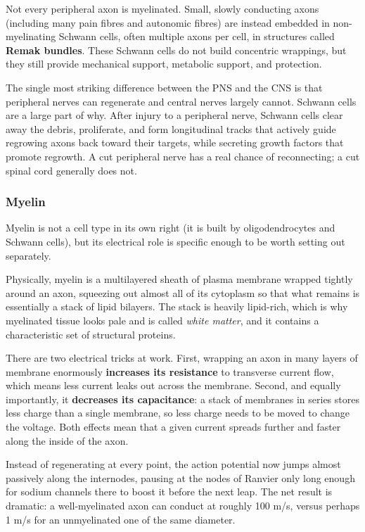 \documentclass[11pt]{article}
\begin{document}
Not every peripheral axon is myelinated. Small, slowly conducting axons (including many pain fibres and autonomic fibres) are instead embedded in non-myelinating Schwann cells, often multiple axons per cell, in structures called \textbf{Remak bundles}. These Schwann cells do not build concentric wrappings, but they still provide mechanical support, metabolic support, and protection.

The single most striking difference between the PNS and the CNS is that peripheral nerves can regenerate and central nerves largely cannot. Schwann cells are a large part of why. After injury to a peripheral nerve, Schwann cells clear away the debris, proliferate, and form longitudinal tracks that actively guide regrowing axons back toward their targets, while secreting growth factors that promote regrowth. A cut peripheral nerve has a real chance of reconnecting; a cut spinal cord generally does not.

\subsubsection{Myelin}

Myelin is not a cell type in its own right (it is built by oligodendrocytes and Schwann cells), but its electrical role is specific enough to be worth setting out separately.

Physically, myelin is a multilayered sheath of plasma membrane wrapped tightly around an axon, squeezing out almost all of its cytoplasm so that what remains is essentially a stack of lipid bilayers. The stack is heavily lipid-rich, which is why myelinated tissue looks pale and is called \textit{white matter}, and it contains a characteristic set of structural proteins.

There are two electrical tricks at work. First, wrapping an axon in many layers of membrane enormously \textbf{increases its resistance} to transverse current flow, which means less current leaks out across the membrane. Second, and equally importantly, it \textbf{decreases its capacitance}: a stack of membranes in series stores less charge than a single membrane, so less charge needs to be moved to change the voltage. Both effects mean that a given current spreads further and faster along the inside of the axon.

Instead of regenerating at every point, the action potential now jumps almost passively along the internodes, pausing at the nodes of Ranvier only long enough for sodium channels there to boost it before the next leap. The net result is dramatic: a well-myelinated axon can conduct at roughly 100 m/s, versus perhaps 1 m/s for an unmyelinated one of the same diameter.
\end{document}
